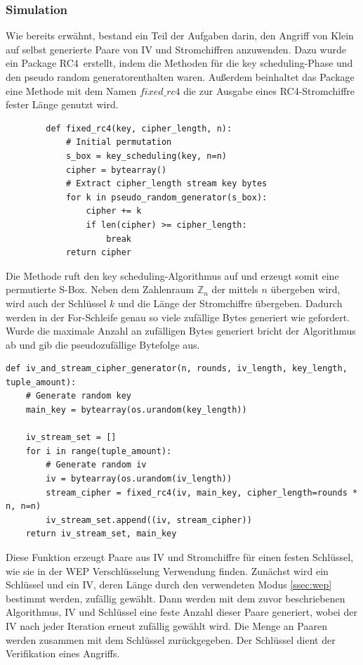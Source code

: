 \documentclass[10pt,a4paper]{article}
\begin{document}
\subsubsection{Simulation}
Wie bereits erwähnt, bestand ein Teil der Aufgaben darin, den Angriff von Klein auf selbst generierte Paare von IV und Stromchiffren anzuwenden. Dazu wurde ein Package \glqq RC4\grqq\ erstellt, indem die Methoden für die \glqq key scheduling\grqq -Phase und den \glqq pseudo random generator\grqq enthalten waren. Außerdem beinhaltet das Package eine Methode mit dem Namen $fixed\_rc4$ die zur Ausgabe eines RC4-Stromchiffre fester Länge genutzt wird.
\begin{lstlisting}
		def fixed_rc4(key, cipher_length, n):
    		# Initial permutation
    		s_box = key_scheduling(key, n=n)
    		cipher = bytearray()
    		# Extract cipher_length stream key bytes
    		for k in pseudo_random_generator(s_box):
        		cipher += k
        		if len(cipher) >= cipher_length:
            		break
    		return cipher
\end{lstlisting}
Die Methode ruft den \glqq key scheduling\grqq -Algorithmus auf und erzeugt somit eine permutierte S-Box. Neben dem Zahlenraum $\mathbb{Z}_n$ der mittels $n$ übergeben wird, wird auch der Schlüssel $k$ und die Länge der Stromchiffre übergeben. Dadurch werden in der For-Schleife genau so viele zufällige Bytes generiert wie gefordert. Wurde die maximale Anzahl an zufälligen Bytes generiert bricht der Algorithmus ab und gib die pseudozufällige Bytefolge aus.
\begin{lstlisting}
def iv_and_stream_cipher_generator(n, rounds, iv_length, key_length, tuple_amount):
    # Generate random key
    main_key = bytearray(os.urandom(key_length))

    iv_stream_set = []
    for i in range(tuple_amount):
        # Generate random iv
        iv = bytearray(os.urandom(iv_length))
        stream_cipher = fixed_rc4(iv, main_key, cipher_length=rounds * n, n=n)
        iv_stream_set.append((iv, stream_cipher))
    return iv_stream_set, main_key
\end{lstlisting}
Diese Funktion erzeugt Paare aus IV und Stromchiffre für einen festen Schlüssel, wie sie in der WEP Verschlüsselung Verwendung finden. Zunächst wird ein Schlüssel und ein IV, deren Länge durch den verwendeten Modus \ref{ssec:wep} bestimmt werden, zufällig gewählt. Dann werden mit dem zuvor beschriebenen Algorithmus, IV und Schlüssel eine feste Anzahl dieser Paare generiert, wobei der IV nach jeder Iteration erneut zufällig gewählt wird. Die Menge an Paaren werden zusammen mit dem Schlüssel zurückgegeben. Der Schlüssel dient der Verifikation eines Angriffs.
\end{document}
